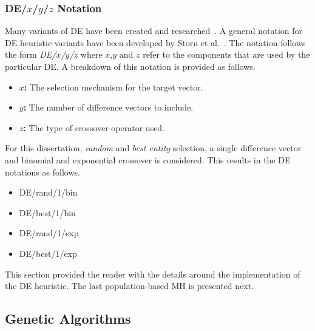 \subsubsection{DE/$x$/$y$/$z$ Notation}

Many variants of \acs{DE} have been created and researched~\cite{ref:mezura:2006}. A general notation for \acs{DE} heuristic variants have been developed by Storn et al.~\cite{ref:storn:1996}\cite{ref:storn:1997}. The notation follows the form \textit{DE/$x$/$y$/$z$} where $x$,$y$ and $z$ refer to the components that are used by the particular \acs{DE}. A breakdown of this notation is provided as follows.

\begin{itemize}
      \item \textbf{$x$:} The selection mechanism for the target vector.
      \item \textbf{$y$:} The number of difference vectors to include.
      \item \textbf{$z$:} The type of crossover operator used.
\end{itemize}

For this dissertation, \textit{random} and \textit{best entity} selection, a single difference vector and binomial and exponential crossover is considered. This results in the \acs{DE} notations as follows.

\begin{itemize}
      \item DE/rand/1/bin
      \item DE/best/1/bin
      \item DE/rand/1/exp
      \item DE/best/1/exp
\end{itemize}

This section provided the reader with the details around the implementation of the \acs{DE} heuristic. The last population-based \acs{MH} is presented next.


\subsection{Genetic Algorithms}
\label{sec:heuristics:mh:ga}

